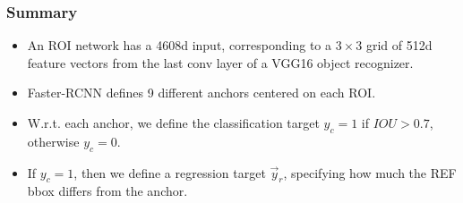 \documentclass{beamer}
\begin{document}
\begin{frame}
  \frametitle{Summary}
  \begin{itemize}
  \item An ROI network has a 4608d input, corresponding to a $3\times
    3$ grid of 512d feature vectors from the last conv layer of a
    VGG16 object recognizer.
  \item Faster-RCNN defines 9 different anchors centered on each ROI.
  \item W.r.t. each anchor, we define the classification target
    $y_c=1$ if $IOU>0.7$, otherwise $y_c=0$.
  \item If $y_c=1$, then we define a regression target $\vec{y}_r$,
    specifying how much the REF bbox differs from the anchor.
  \end{itemize}
\end{frame}
   
\end{document}
